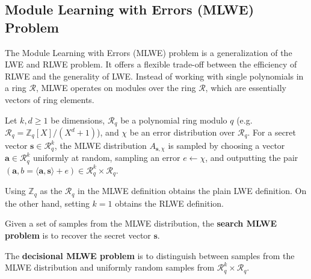 \subsection{Module Learning with Errors (MLWE) Problem} 
The Module Learning with Errors (MLWE) problem is a generalization of the LWE and RLWE problem. It offers a flexible trade-off between the efficiency of RLWE and the generality of LWE. Instead of working with single polynomials in a ring $\mathcal{R}$, MLWE operates on modules over the ring $\mathcal{R}$, which are essentially vectors of ring elements.
\begin{definition}
Let $k, d \ge 1$ be dimensions, $\mathcal{R}_q$ be a polynomial ring modulo $q$ (e.g. $\mathcal{R}_q = \mathbb{Z}_q[X]/(X^d + 1)$), and $\chi$ be an error distribution over $\mathcal{R}_q$. For a secret vector $\mathbf{s} \in \mathcal{R}_q^k$, the MLWE distribution $A_{\mathbf{s}, \chi}$ is sampled by choosing a vector $\mathbf{a} \in \mathcal{R}_q^k$ uniformly at random, sampling an error $e \leftarrow \chi$, and outputting the pair $(\mathbf{a}, b = \langle \mathbf{a}, \mathbf{s} \rangle + e) \in \mathcal{R}_q^k \times \mathcal{R}_q$.
\end{definition}
\noindent Using $\mathbb{Z}_q$ as the $\mathcal{R}_q$ in the MLWE definition obtains the plain LWE definition. On the other hand, setting $k=1$ obtains the RLWE definition.
\begin{definition}
Given a set of samples from the MLWE distribution, the \textbf{search MLWE problem} is to recover the secret vector $\mathbf{s}$.
\end{definition}

\begin{definition}
The \textbf{decisional MLWE problem} is to distinguish between samples from the MLWE distribution and uniformly random samples from $\mathcal{R}_q^k \times \mathcal{R}_q$.
\end{definition}

